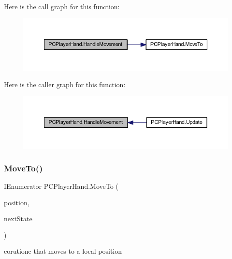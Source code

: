 Here is the call graph for this function\+:
\nopagebreak
\begin{figure}[H]
\begin{center}
\leavevmode
\includegraphics[width=350pt]{class_p_c_player_hand_a81d7137403650fb8da125b6356d50496_cgraph}
\end{center}
\end{figure}
Here is the caller graph for this function\+:
\nopagebreak
\begin{figure}[H]
\begin{center}
\leavevmode
\includegraphics[width=350pt]{class_p_c_player_hand_a81d7137403650fb8da125b6356d50496_icgraph}
\end{center}
\end{figure}
\mbox{\label{class_p_c_player_hand_a338f6e5898a4953d48c046354ffef9e2}} 
\subsubsection{\texorpdfstring{Move\+To()}{MoveTo()}}
{\footnotesize\ttfamily I\+Enumerator P\+C\+Player\+Hand.\+Move\+To (\begin{DoxyParamCaption}\item[{Vector3}]{position,  }\item[{\mbox{\hyperlink{class_player_hand_a1af76750da713cbc88856161d8d5ac0e}{Hand\+State}}}]{next\+State }\end{DoxyParamCaption})\hspace{0.3cm}{\ttfamily [private]}}



corutione that moves to a local position 


